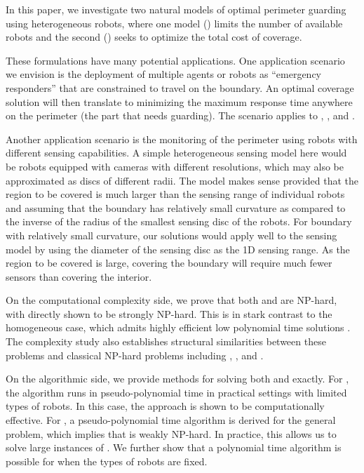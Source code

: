 In this paper, we investigate two natural models of optimal perimeter 
guarding using heterogeneous robots, where one model (\opglr) limits 
the number of available robots and the second (\opgmc) seeks to 
optimize the total cost of coverage. 

These formulations have many potential applications. One application 
scenario we envision is the deployment of multiple agents or robots 
as ``emergency responders'' that are constrained to travel on the 
boundary. An optimal coverage solution will then translate to minimizing 
the maximum response time anywhere on the perimeter (the part that 
needs guarding). The scenario applies to \opg, \opglr, and \opgmc. 

Another application scenario is the monitoring of the perimeter 
using robots with different sensing capabilities. A simple heterogeneous 
sensing model here would be robots equipped with cameras with different 
resolutions, which may also be approximated as discs of different radii. 
The model makes sense provided that the region to be covered is much 
larger than the sensing range of individual robots and assuming that the 
boundary has relatively small curvature as compared to the inverse of the 
radius of the smallest sensing disc of the robots. For boundary with 
relatively small curvature, our solutions would apply well to the sensing 
model by using the diameter of the sensing disc as the 1D sensing range. 
As the region to be covered is large, covering the boundary will require
much fewer sensors than covering the interior. 


On the computational complexity 
side, we prove that both \opglr and \opgmc are NP-hard, with \opglr 
directly shown to be strongly NP-hard. This is in stark contrast to 
the homogeneous case, which admits highly efficient low polynomial 
time solutions \cite{fenghangaoyu2019efficient}. The complexity study also 
establishes structural similarities between these problems and 
classical NP-hard problems including \tpart, \ttkp, and \subsetsum.

On the algorithmic side, we provide methods for solving both \opglr 
and \opgmc exactly. For \opglr, the algorithm runs in pseudo-polynomial 
time in practical settings with limited types of robots. In 
this case, the approach is shown to be computationally effective. 
For \opgmc, a pseudo-polynomial time algorithm is derived for the 
general problem, which implies that \opgmc is weakly NP-hard. In 
practice, this allows us to solve large instances of \opgmc. We 
further show that a polynomial time algorithm is possible for 
\opgmc when the types of robots are fixed. 

